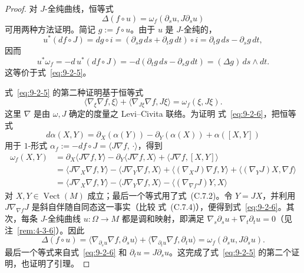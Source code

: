 \begin{proof}
对 $J$-全纯曲线，恒等式
\begin{equation}\label{eq:9-2-5}
  \Delta(f\circ u)=\omega_f(\partial_su,J\partial_su)
\end{equation}
可用两种方法证明。简记 $g:=f\circ u$。由于 $u$ 是 $J$-全纯的，
\[
  u^*(df\circ J)=dg\circ i
  =(\partial_sg\,ds+\partial_tg\,dt)\circ i
  =\partial_tg\,ds-\partial_sg\,dt,
\]
因而
\[
  u^*\omega_f
  =-d\,u^*(df\circ J)
  =-d(\partial_tg\,ds-\partial_sg\,dt)
  =(\Delta g)\,ds\wedge dt.
\]
这等价于式~\eqref{eq:9-2-5}。

式~\eqref{eq:9-2-5} 的第二种证明基于恒等式
\begin{equation}\label{eq:9-2-6}
  \langle\nabla_\xi\nabla f,\xi\rangle
  +\langle\nabla_{J\xi}\nabla f,J\xi\rangle
  =\omega_f(\xi,J\xi).
\end{equation}
这里 $\nabla$ 是由 $\omega,J$ 确定的度量之 Levi--Civita 联络。为证明
式~\eqref{eq:9-2-6}，把恒等式
\[
  d\alpha(X,Y)=\partial_X(\alpha(Y))-\partial_Y(\alpha(X))+\alpha([X,Y])
\]
用于 $1$-形式 $\alpha_f:=-df\circ J=\langle J\nabla f,\,·\rangle$，得到
\[
\begin{aligned}
  \omega_f(X,Y)
  &=\partial_X\langle J\nabla f,Y\rangle
    -\partial_Y\langle J\nabla f,X\rangle
    +\langle J\nabla f,[X,Y]\rangle\\
  &=\langle J\nabla_X\nabla f,Y\rangle
    -\langle J\nabla_Y\nabla f,X\rangle
    +\langle(\nabla_XJ)\nabla f,Y\rangle
    +\langle(\nabla_YJ)X,\nabla f\rangle\\
  &=\langle J\nabla_X\nabla f,Y\rangle
    -\langle J\nabla_Y\nabla f,X\rangle
    -\langle(\nabla_{\nabla f}J)Y,X\rangle
\end{aligned}
\]
对 $X,Y\in\operatorname{Vect}(M)$ 成立；最后一个等式用了式~(C.7.2)。令
$Y=JX$，并利用 $J\nabla_{\nabla f}J$ 是斜自伴随自同态这一事实（比较
式~(C.7.4)），便得到式~\eqref{eq:9-2-6}。其次，每条 $J$-全纯曲线
$u:\Omega\to M$ 都是调和映射，即满足
$\nabla_s\partial_su+\nabla_t\partial_tu=0$（见注~\ref{rem:4-3-6}）。因此
\[
  \Delta(f\circ u)
  =\langle\nabla_{\partial_su}\nabla f,\partial_su\rangle
   +\langle\nabla_{\partial_tu}\nabla f,\partial_tu\rangle
  =\omega_f(\partial_su,J\partial_su).
\]
最后一个等式来自式~\eqref{eq:9-2-6} 和
$\partial_tu=J\partial_su$。这完成了式~\eqref{eq:9-2-5} 的第二个证明，也证明了引理。
\end{proof}


